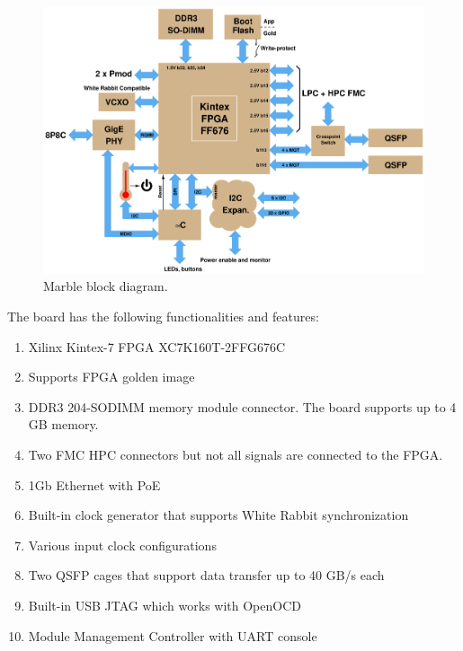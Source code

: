 \documentclass[12pt,oneside,a4]{article}
\begin{document}
\begin{figure}[H]
\begin{center}
\includegraphics[width=1\linewidth]{block_k3.png}
 \caption{Marble block diagram.}\label{block}
\end{center}
\end{figure}

The board has the following functionalities and features:
\begin{enumerate}
	\item Xilinx Kintex-7 FPGA XC7K160T-2FFG676C
	\item Supports FPGA golden image
	\item DDR3 204-SODIMM memory module connector. The board supports up to 4 GB memory. 
	\item Two FMC HPC connectors but not all signals are connected to the FPGA. 
	\item 1Gb Ethernet with PoE
	\item Built-in clock generator that supports  White Rabbit synchronization 
	\item Various input clock configurations
	\item Two QSFP cages that support data transfer up to 40 GB/s each
	\item Built-in USB JTAG which works with OpenOCD
	\item Module Management Controller with UART console
\end{enumerate}
\end{document}
